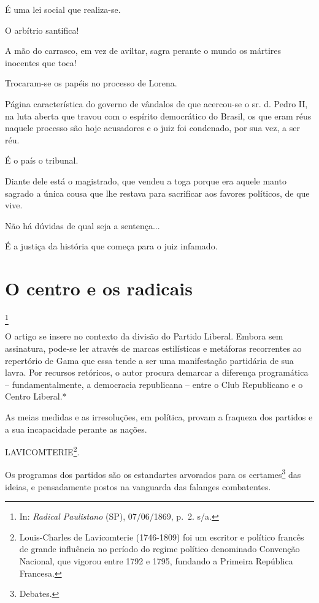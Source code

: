 É uma lei social que realiza-se.

O arbítrio santifica!

A mão do carrasco, em vez de aviltar, sagra perante o mundo os mártires
inocentes que toca!

Trocaram-se os papéis no processo de Lorena.

Página característica do governo de vândalos de que acercou-se o sr. d.
Pedro II, na luta aberta que travou com o espírito democrático do
Brasil, os que eram réus naquele processo são hoje acusadores e o juiz
foi condenado, por sua vez, a ser réu.

É o país o tribunal.

Diante dele está o magistrado, que vendeu a toga porque era aquele manto
sagrado a única cousa que lhe restava para sacrificar aos favores
políticos, de que vive.

Não há dúvidas de qual seja a sentença...

É a justiça da história que começa para o juiz infamado.

\chapter{O centro e os radicais}\footnote{In: \emph{Radical Paulistano}
  (SP), 07/06/1869, p.~2. s/a.}

\begin{didascalia}
O artigo se insere no contexto da divisão do Partido Liberal. Embora sem
assinatura, pode-se ler através de marcas estilísticas e metáforas
recorrentes ao repertório de Gama que essa tende a ser uma manifestação
partidária de sua lavra. Por recursos retóricos, o autor procura
demarcar a diferença programática -- fundamentalmente, a democracia
republicana -- entre o Club Republicano e o Centro Liberal.*
\end{didascalia}

\asterisc{}

As meias medidas e as irresoluções, em política, provam a fraqueza dos
partidos e a sua incapacidade perante as nações.

LAVICOMTERIE\footnote{Louis-Charles de Lavicomterie (1746-1809) foi um
  escritor e político francês de grande influência no período do regime
  político denominado Convenção Nacional, que vigorou entre 1792 e 1795,
  fundando a Primeira República Francesa.}.

Os programas dos partidos são os estandartes arvorados para os
certames\footnote{Debates.} das ideias, e pensadamente postos na
vanguarda das falanges combatentes.

